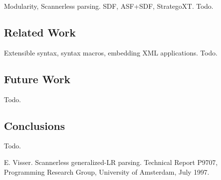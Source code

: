 \documentclass[a4paper,11pt]{article}
\begin{document}
Modularity, Scannerless parsing.
SDF, ASF+SDF, StrategoXT.
Todo.


\subsection{Related Work}

Extensible syntax, syntax macros, embedding XML applications.
Todo.


\subsection{Future Work}

Todo.


\subsection{Conclusions}

Todo.


\begin{thebibliography}{99}

E. Visser. Scannerless generalized-LR parsing.
Technical Report P9707, Programming Research Group, University of Amsterdam, July 1997.

\end{thebibliography}
\end{document}
